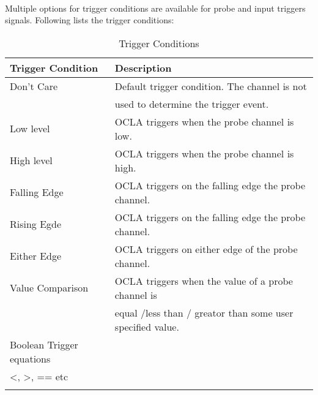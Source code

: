\paragraph{}Multiple options for trigger conditions are available for probe and input triggers signals. Following lists the trigger conditions:
\begin{longtable}{|l|l|}
	\hline
	\textbf{Trigger Condition} & \textbf{Description}                                                                                                \\ \hline
	\endfirsthead
	\endhead
	Don’t Care                 & Default trigger condition. The channel is not \\ & used to determine the trigger event.                                  \\ \hline
	Low level                  & OCLA triggers when the probe channel is low.                                                                              \\ \hline
	High level                 & OCLA triggers when the probe channel is high.                                                                             \\ \hline
	Falling Edge               & OCLA triggers on the falling edge the probe channel.                                                                          \\ \hline
	Rising Egde                & OCLA triggers on the falling edge the probe channel.                                                                           \\ \hline
	Either Edge                & OCLA triggers on either edge of the probe channel.                                                                \\ \hline
	Value Comparison           & OCLA triggers when the value of a probe channel is \\ & equal /less than / greator than some user specified value.       \\ \hline

	Boolean Trigger equations  & \begin{tabular}[c]{@{}l@{}}Advance Trigger Conditions AND, OR, \\  \textless{}, \textgreater{}, == etc\end{tabular} \\ \hline
	\caption{Trigger Conditions}
	\label{tab:Trigger-Condition}                                                                                                                    \\
\end{longtable}
